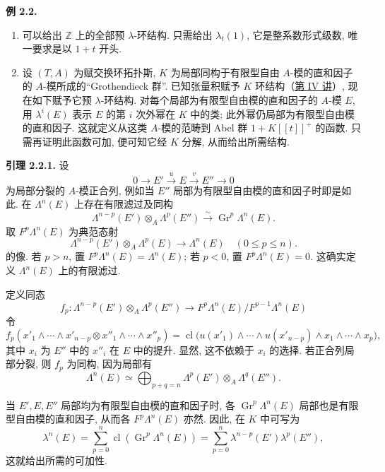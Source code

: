 \textbf{例 2.2.}
\begin{enumerate}[label=\alph*)]
\item 可以给出 \(\mathbb Z\) 上的全部预 \(\lambda\)-环结构. 只需给出 \(\lambda_t(1)\), 它是整系数形式级数, 唯一要求是以 \(1+t\) 开头.

\item 设 \((T,A)\) 为赋交换环拓扑斯, \(K\) 为局部同构于有限型自由 \(A\)-模的直和因子的 \(A\)-模所成的“Grothendieck 群”. 已知张量积赋予 \(K\) 环结构（\hyperlink{sga6.e04.expose}{第 IV 讲}）, 现在如下赋予它预 \(\lambda\)-环结构. 对每个局部为有限型自由模的直和因子的 \(A\)-模 \(E\), 用 \(\lambda^i(E)\) 表示 \(E\) 的第 \(i\) 次外幂在 \(K\) 中的类; 此外幂仍局部为有限型自由模的直和因子. 这就定义从这类 \(A\)-模的范畴到 Abel 群 \(1+K[[t]]^+\) 的函数. 只需再证明此函数可加, 便可知它经 \(K\) 分解, 从而给出所需结构.
\end{enumerate}

\textbf{引理 2.2.1.} 设
\[
  0\longrightarrow E' \xrightarrow{u} E \xrightarrow{v} E''\longrightarrow 0
\]
为局部分裂的 \(A\)-模正合列, 例如当 \(E''\) 局部为有限型自由模的直和因子时即是如此. 在 \(\Lambda^n(E)\) 上存在有限滤过及同构
\[
  \Lambda^{n-p}(E')\otimes_A\Lambda^p(E'')
  \xrightarrow{\sim}
  \operatorname{Gr}^p\Lambda^n(E).
\]
取 \(F^p\Lambda^n(E)\) 为典范态射
\[
  \Lambda^{n-p}(E')\otimes_A\Lambda^p(E)\longrightarrow \Lambda^n(E)
  \quad (0\leq p\leq n).
\]
的像. 若 \(p>n\), 置 \(F^p\Lambda^n(E)=\Lambda^n(E)\); 若 \(p<0\), 置 \(F^p\Lambda^n(E)=0\). 这确实定义 \(\Lambda^n(E)\) 上的有限滤过.

定义同态
\[
  f_p:\Lambda^{n-p}(E')\otimes_A\Lambda^p(E'')
  \longrightarrow
  F^p\Lambda^n(E)/F^{p-1}\Lambda^n(E)
\]
令
\[
  f_p(x'_1\wedge\cdots\wedge x'_{n-p}\otimes x''_1\wedge\cdots\wedge x''_p)
  =
  \operatorname{cl}\bigl(u(x'_1)\wedge\cdots\wedge u(x'_{n-p})\wedge
  x_1\wedge\cdots\wedge x_p\bigr),
\]
其中 \(x_i\) 为 \(E''\) 中的 \(x''_i\) 在 \(E\) 中的提升. 显然, 这不依赖于 \(x_i\) 的选择. 若正合列局部分裂, 则 \(f_p\) 为同构, 因为局部有
\[
  \Lambda^n(E)\simeq\bigoplus_{p+q=n}
  \Lambda^p(E')\otimes_A\Lambda^q(E'').
\]

当 \(E',E,E''\) 局部均为有限型自由模的直和因子时, 各 \(\operatorname{Gr}^p\Lambda^n(E)\) 局部也是有限型自由模的直和因子, 从而各 \(F^p\Lambda^n(E)\) 亦然. 因此, 在 \(K\) 中可写为
\[
  \lambda^n(E)=\sum_{p=0}^{n}\operatorname{cl}(\operatorname{Gr}^p\Lambda^n(E))
  =
  \sum_{p=0}^{n}\lambda^{n-p}(E')\lambda^p(E''),
\]
这就给出所需的可加性.

